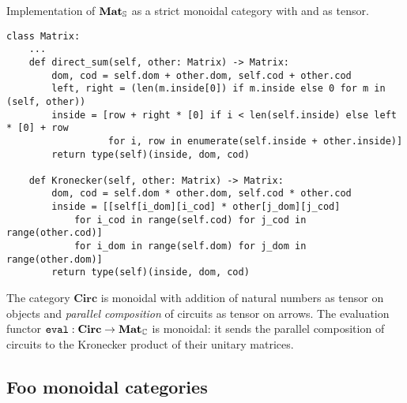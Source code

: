 \begin{python}
{\normalfont Implementation of $\mathbf{Mat}_\S$ as a strict monoidal category with  and  as tensor.}

\begin{verbatim}
class Matrix:
    ...
    def direct_sum(self, other: Matrix) -> Matrix:
        dom, cod = self.dom + other.dom, self.cod + other.cod
        left, right = (len(m.inside[0]) if m.inside else 0 for m in (self, other))
        inside = [row + right * [0] if i < len(self.inside) else left * [0] + row
                  for i, row in enumerate(self.inside + other.inside)]
        return type(self)(inside, dom, cod)

    def Kronecker(self, other: Matrix) -> Matrix:
        dom, cod = self.dom * other.dom, self.cod * other.cod
        inside = [[self[i_dom][i_cod] * other[j_dom][j_cod]
            for i_cod in range(self.cod) for j_cod in range(other.cod)]
            for i_dom in range(self.dom) for j_dom in range(other.dom)]
        return type(self)(inside, dom, cod)
\end{verbatim}
\end{python}

\begin{example}
The category $\mathbf{Circ}$ is monoidal with addition of natural numbers as tensor on objects and \emph{parallel composition} of circuits as tensor on arrows.
The evaluation functor $\mathtt{eval} : \mathbf{Circ} \to \mathbf{Mat}_\C$ is monoidal: it sends the parallel composition of circuits to the Kronecker product of their unitary matrices.
\end{example}

\subsection{Foo monoidal categories}

